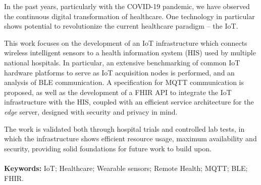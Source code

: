 
\vspace{1cm}
\noindent

In the past years, particularly with the COVID-19 pandemic, we have observed the continuous digital transformation of healthcare. One technology in particular shows potential to revolutionize the current healthcare paradigm -- the \acf{IoT}.

This work focuses on the development of an \acs{IoT} infrastructure which connects wireless intelligent sensors to a health information system (\acs{HIS}) used by multiple national hospitals. In particular, an extensive benchmarking of common \acs{IoT} hardware platforms to serve as \acs{IoT} acquisition nodes is performed, and an analysis of \acf{BLE} communication. A specification for \acf{MQTT} communication is proposed, as well as the development of a \acf{FHIR} \acf{API} to integrate the \acs{IoT} infrastructure with the \acs{HIS}, coupled with an efficient service architecture for the \textit{edge} server, designed with security and privacy in mind.

The work is validated both through hospital trials and controlled lab tests, in which the infrastructure shows efficient resource usage, maximum availability and security, providing solid foundations for future work to build upon.

\paragraph{}\textbf{Keywords:} IoT; Healthcare; Wearable sensors; Remote Health; MQTT; BLE; FHIR.